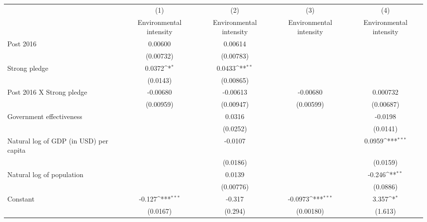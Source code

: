 {
\def\sym#1{\ifmmode^{#1}\else\(^{#1}\)\fi}
\begin{tabular}{l*{4}{c}}
\hline\hline
                    &\multicolumn{1}{c}{(1)}&\multicolumn{1}{c}{(2)}&\multicolumn{1}{c}{(3)}&\multicolumn{1}{c}{(4)}\\
                    &\multicolumn{1}{c}{Environmental intensity}&\multicolumn{1}{c}{Environmental intensity}&\multicolumn{1}{c}{Environmental intensity}&\multicolumn{1}{c}{Environmental intensity}\\
\hline
Post 2016           &     0.00600         &     0.00614         &                     &                     \\
                    &   (0.00732)         &   (0.00783)         &                     &                     \\
[1em]
Strong pledge       &      0.0372\sym{*}  &      0.0433\sym{**} &                     &                     \\
                    &    (0.0143)         &   (0.00865)         &                     &                     \\
[1em]
Post 2016 X Strong pledge&    -0.00680         &    -0.00613         &    -0.00680         &    0.000732         \\
                    &   (0.00959)         &   (0.00947)         &   (0.00599)         &   (0.00687)         \\
[1em]
Government effectiveness&                     &      0.0316         &                     &     -0.0198         \\
                    &                     &    (0.0252)         &                     &    (0.0141)         \\
[1em]
Natural log of GDP (in USD) per capita&                     &     -0.0107         &                     &      0.0959\sym{***}\\
                    &                     &    (0.0186)         &                     &    (0.0159)         \\
[1em]
Natural log of population&                     &      0.0139         &                     &      -0.246\sym{**} \\
                    &                     &   (0.00776)         &                     &    (0.0886)         \\
[1em]
Constant            &      -0.127\sym{***}&      -0.317         &     -0.0973\sym{***}&       3.357\sym{*}  \\
                    &    (0.0167)         &     (0.294)         &   (0.00180)         &     (1.613)         \\

\end{tabular}}
